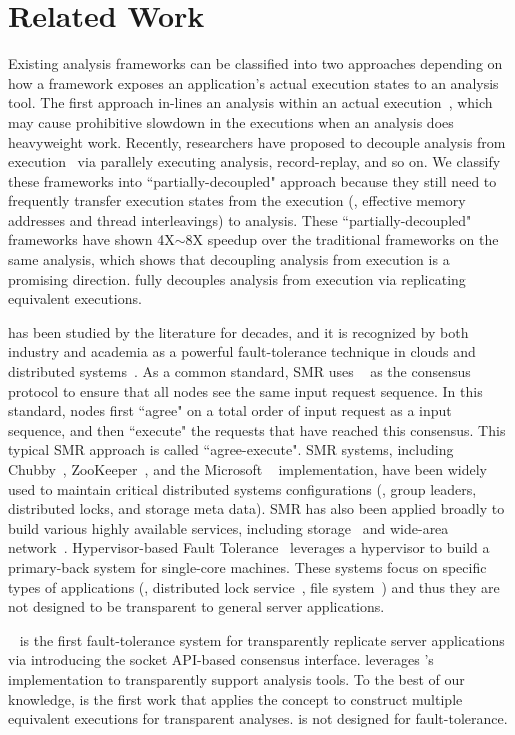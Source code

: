 \section{Related Work} \label{sec:related}

Existing analysis frameworks can be classified into two approaches depending 
on how a framework exposes an application's actual execution states to an 
analysis tool. The first approach in-lines an analysis within an 
actual execution~\cite{dynamorio, pin:pldi05, 
valgrind:pldi, lift:micro06, tsan}, which may cause prohibitive slowdown in the
executions when an analysis does heavyweight work. Recently, researchers have
proposed to 
decouple analysis from execution~\cite{decouple:usenix08, speck:asplos08, 
shadowreplica:ccs13, wester:parallelizing:asplos13, superpin, jungwoo:oopsla09} 
via parallely executing analysis, record-replay, and so on. We classify these
frameworks into ``partially-decoupled" approach because they still need to
frequently 
transfer execution states from the execution (\eg, effective memory addresses 
and thread interleavings) to analysis. These ``partially-decoupled" frameworks 
have shown 4X$\sim$8X speedup over the traditional frameworks on the same 
analysis, which shows that decoupling analysis from execution is a promising 
direction. \xxx fully decouples analysis from execution via replicating 
equivalent executions.

\smr has been studied by the literature for decades, and it is recognized by 
both industry and academia as a powerful fault-tolerance technique in clouds 
and distributed systems~\cite{lamportclock, smr:tutorial}. As a common 
standard, SMR uses \paxos~\cite{paxos} as the consensus protocol to ensure that 
all nodes see the same input request sequence. In this standard, nodes first 
``agree" on a total order of input request as a input sequence, and then 
``execute" the requests that have reached this consensus. This typical SMR 
approach is called ``agree-execute". SMR systems, including 
Chubby~\cite{chubby:osdi}, ZooKeeper~\cite{zookeeper}, and 
the Microsoft \paxos~\cite{paxos} implementation, have been widely used to 
maintain critical distributed systems configurations (\eg, group leaders, 
distributed locks, and storage meta data). SMR has also been applied broadly to 
build various highly available services, including 
storage~\cite{paxos:datastore} and wide-area network~\cite{mencius:osdi08}. 
Hypervisor-based Fault Tolerance~\cite{hft:sosp95} leverages a hypervisor to 
build a primary-back system for single-core machines. These systems focus on 
specific types of applications (\eg, distributed lock service~\cite{chubby:osdi}, file 
system~\cite{zookeeper}) and thus they are not designed to be transparent to 
general server applications.

\repbox~\cite{repbox:sosp15} is the first fault-tolerance system for transparently replicate 
server applications via introducing the socket API-based \paxos consensus interface. 
\xxx leverages \repbox's \paxos implementation to transparently support analysis 
tools. To the best of our knowledge, \xxx is the first work that applies the 
\smr concept to construct multiple equivalent executions for transparent 
analyses. \xxx is not designed for fault-tolerance.

